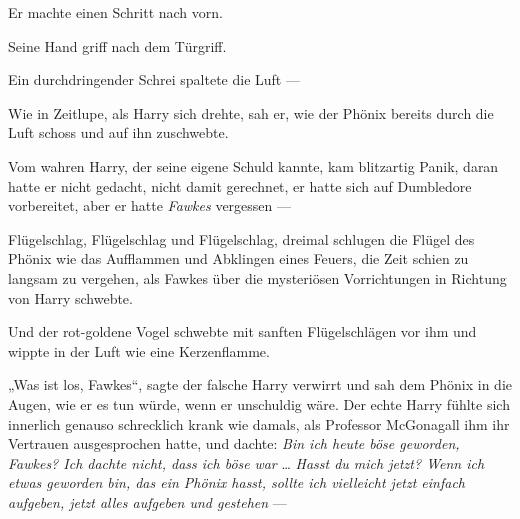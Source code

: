 Er machte einen Schritt nach vorn.

Seine Hand griff nach dem Türgriff.

Ein durchdringender Schrei spaltete die Luft —

Wie in Zeitlupe, als Harry sich drehte, sah er, wie der Phönix bereits durch die Luft schoss und auf ihn zuschwebte.

Vom wahren Harry, der seine eigene Schuld kannte, kam blitzartig Panik, daran hatte er nicht gedacht, nicht damit gerechnet, er hatte sich auf Dumbledore vorbereitet, aber er hatte \emph{Fawkes} vergessen —

Flügelschlag, Flügelschlag und Flügelschlag, dreimal schlugen die Flügel des Phönix wie das Aufflammen und Abklingen eines Feuers, die Zeit schien zu langsam zu vergehen, als Fawkes über die mysteriösen Vorrichtungen in Richtung von Harry schwebte.

Und der rot-goldene Vogel schwebte mit sanften Flügelschlägen vor ihm und wippte in der Luft wie eine Kerzenflamme.

„Was ist los, Fawkes“, sagte der falsche Harry verwirrt und sah dem Phönix in die Augen, wie er es tun würde, wenn er unschuldig wäre. Der echte Harry fühlte sich innerlich genauso schrecklich krank wie damals, als Professor McGonagall ihm ihr Vertrauen ausgesprochen hatte, und dachte: \emph{Bin ich heute böse geworden, Fawkes? Ich dachte nicht, dass ich böse} \emph{war} … \emph{Hasst du mich jetzt? Wenn ich etwas geworden bin, das ein Phönix hasst, sollte ich vielleicht jetzt einfach aufgeben, jetzt alles aufgeben und gestehen} —

